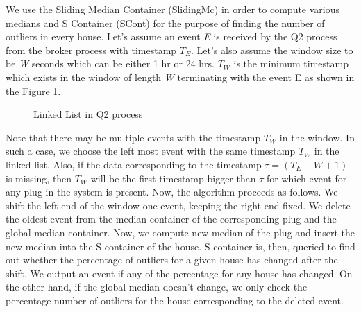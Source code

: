 We use the Sliding Median Container (SlidingMc) in order to compute various medians and S Container (SCont) for the purpose of finding the number of outliers in every house.
Let's assume an event \textit{E} is received by the Q2 process from the broker process with timestamp \textit{$T_E$}.
Let's also assume the window size to be \textit{W} seconds which can be either 1 hr or 24 hrs.
\textit{$T_W$} is the minimum timestamp which exists in the window of length \textit{W} terminating with the event E as shown in the Figure \ref{fig:linked_list}.

\begin{figure}[h]
\begin{center}
\caption{Linked List in Q2 process \label{fig:linked_list}}
\end{center}
\end{figure}

Note that there may be multiple events with the timestamp $T_W$ in the window.
In such a case, we choose the left most event with the same timestamp $T_W$ in the linked list.
Also, if the data corresponding to the timestamp $\tau = (T_E - W +1)$ is missing, then $T_W$ will be the first timestamp bigger than $\tau$ for which event for any plug in the system is present.
Now, the algorithm proceeds as follows.
We shift the left end of the window one event, keeping the right end fixed.
We delete the oldest event from the median container of the corresponding plug and the global median container.
Now, we compute new median of the plug and insert the new median into the S container of the house.
S container is, then, queried to find out whether the percentage of outliers for a given house has changed after the shift.
We output an event if any of the percentage for any house has changed.
On the other hand, if the global median doesn't change, we only check the percentage number of outliers for the house corresponding to the deleted event.

